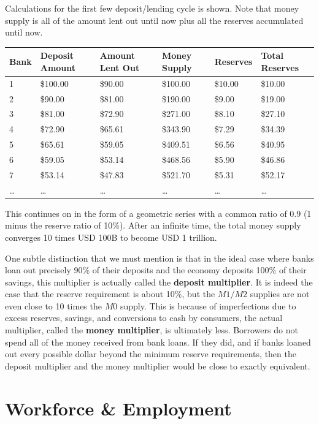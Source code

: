 \documentclass{article}
\begin{document}
      Calculations for the first few deposit/lending cycle is shown. Note that money supply is all of the amount lent out until now plus all the reserves accumulated until now.

      \begin{tabular}{|l|l|l|l|l|l|}
      \hline
      Bank & Deposit Amount & Amount Lent Out & Money Supply & Reserves & Total Reserves \\
      \hline
      1 & \$100.00 & \$90.00 & \$100.00 & \$10.00 & \$10.00 \\
      2 & \$90.00 & \$81.00 & \$190.00 & \$9.00 & \$19.00 \\
      3 & \$81.00 & \$72.90 & \$271.00 & \$8.10 & \$27.10 \\
      4 & \$72.90 & \$65.61 & \$343.90 & \$7.29 & \$34.39 \\
      5 & \$65.61 & \$59.05 & \$409.51 & \$6.56 & \$40.95 \\
      6 & \$59.05 & \$53.14 & \$468.56 & \$5.90 & \$46.86 \\
      7 & \$53.14 & \$47.83 & \$521.70 & \$5.31 & \$52.17 \\
      \ldots & \ldots & \ldots & \ldots & \ldots & \ldots \\
      \hline
      \end{tabular}

      This continues on in the form of a geometric series with a common ratio of 0.9 (1 minus the reserve ratio of 10\%). After an infinite time, the total money supply converges 10 times USD 100B to become USD 1 trillion.

      One subtle distinction that we must mention is that in the ideal case where banks loan out precisely 90\% of their deposits and the economy deposits 100\% of their savings, this multiplier is actually called the \textbf{deposit multiplier}. It is indeed the case that the reserve requirement is about 10\%, but the $M1/M2$ supplies are not even close to 10 times the $M0$ supply. This is because of imperfections due to excess reserves, savings, and conversions to cash by consumers, the actual multiplier, called the \textbf{money multiplier}, is ultimately less. Borrowers do not spend all of the money received from bank loans. If they did, and if banks loaned out every possible dollar beyond the minimum reserve requirements, then the deposit multiplier and the money multiplier would be close to exactly equivalent.

\section{Workforce \& Employment} 
\end{document}
